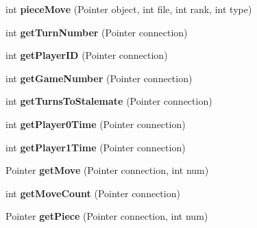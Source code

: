 \begin{DoxyCompactItemize}
\item 
\hypertarget{interfaceClient_ae6117daed1d85523cbede25e9ca8632b}{
int {\bfseries pieceMove} (Pointer object, int file, int rank, int type)}
\label{interfaceClient_ae6117daed1d85523cbede25e9ca8632b}

\item 
\hypertarget{interfaceClient_a1c180b84ed7e74644ac62c1e069e26de}{
int {\bfseries getTurnNumber} (Pointer connection)}
\label{interfaceClient_a1c180b84ed7e74644ac62c1e069e26de}

\item 
\hypertarget{interfaceClient_a45ca933e037a2fa5ce4f97e67eb8b62f}{
int {\bfseries getPlayerID} (Pointer connection)}
\label{interfaceClient_a45ca933e037a2fa5ce4f97e67eb8b62f}

\item 
\hypertarget{interfaceClient_a172426923fb5bd5bdf79a3a3b6caf2e1}{
int {\bfseries getGameNumber} (Pointer connection)}
\label{interfaceClient_a172426923fb5bd5bdf79a3a3b6caf2e1}

\item 
\hypertarget{interfaceClient_a384c1a09c5026e955b79335561a61361}{
int {\bfseries getTurnsToStalemate} (Pointer connection)}
\label{interfaceClient_a384c1a09c5026e955b79335561a61361}

\item 
\hypertarget{interfaceClient_a1f16fbd34fbdee312db08c06d996b98b}{
int {\bfseries getPlayer0Time} (Pointer connection)}
\label{interfaceClient_a1f16fbd34fbdee312db08c06d996b98b}

\item 
\hypertarget{interfaceClient_a2996321a7d00f9179b4bf2b5e7b15665}{
int {\bfseries getPlayer1Time} (Pointer connection)}
\label{interfaceClient_a2996321a7d00f9179b4bf2b5e7b15665}

\item 
\hypertarget{interfaceClient_aa80bcad3cc5675a5636d2e6594fe41d8}{
Pointer {\bfseries getMove} (Pointer connection, int num)}
\label{interfaceClient_aa80bcad3cc5675a5636d2e6594fe41d8}

\item 
\hypertarget{interfaceClient_a03708130a71ab494fd548cdd0fae8174}{
int {\bfseries getMoveCount} (Pointer connection)}
\label{interfaceClient_a03708130a71ab494fd548cdd0fae8174}

\item 
\hypertarget{interfaceClient_a96ec2ddbbb75fdd44e4b0689ef9d901f}{
Pointer {\bfseries getPiece} (Pointer connection, int num)}
\label{interfaceClient_a96ec2ddbbb75fdd44e4b0689ef9d901f}


\end{DoxyCompactItemize}
